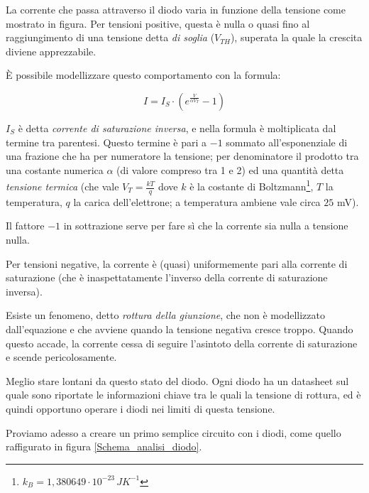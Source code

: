 \documentclass{article}
\begin{document}
La corrente che passa attraverso il diodo varia in funzione della tensione come mostrato in figura. Per tensioni positive, questa è nulla o quasi fino al raggiungimento di una tensione detta \textit{di soglia} ($V_{TH}$), superata la quale la crescita diviene apprezzabile.

\vspace{1mm}

È possibile modellizzare questo comportamento con la formula:

\begin{equation}
I = I_S \cdot \left( e^{\frac{V}{\alpha V_T}} - 1 \right)
\label{Eq_diodo}
\end{equation}

$I_S$ è detta \textit{corrente di saturazione inversa}, e nella formula è moltiplicata dal termine tra parentesi. Questo termine è pari a $-1$ sommato all'esponenziale di una frazione che ha
per numeratore la tensione;
per denominatore il prodotto tra una costante numerica $\alpha$ (di valore compreso tra 1 e 2) ed una quantità detta \textit{tensione termica} (che vale $V_T = \frac{kT}{q}$ dove $k$ è la costante di Boltzmann\footnote{$k_B=1,380649 \cdot 10^{-23} \, JK^{-1}$}, $T$ la temperatura, $q$ la carica dell'elettrone; a temperatura ambiene vale circa $25$ mV).

\vspace{1mm}

Il fattore $-1$ in sottrazione serve per fare sì che la corrente sia nulla a tensione nulla.

Per tensioni negative, la corrente è (quasi) uniformemente pari alla corrente di saturazione (che è inaspettatamente l'inverso della corrente di saturazione inversa).

\vspace{3mm}

Esiste un fenomeno, detto \textit{rottura della giunzione}, che non è modellizzato dall'equazione e che avviene quando la tensione negativa cresce troppo. Quando questo accade, la corrente cessa di seguire l'asintoto della corrente di saturazione e scende pericolosamente. 

Meglio stare lontani da questo stato del diodo. Ogni diodo ha un datasheet sul quale sono riportate le informazioni chiave tra le quali la tensione di rottura, ed è quindi opportuno operare i diodi nei limiti di questa tensione.

Proviamo adesso a creare un primo semplice circuito con i diodi, come quello raffigurato in figura \ref{Schema_analisi_diodo}.
\end{document}
